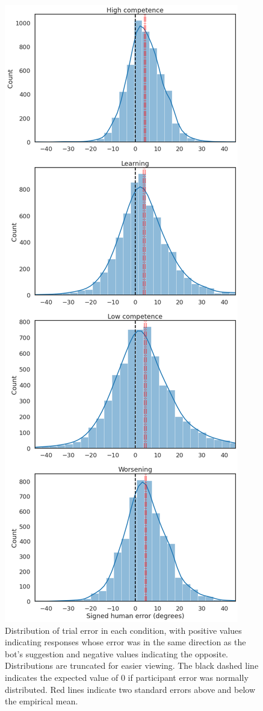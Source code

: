 \documentclass[10pt,letterpaper]{article}
\begin{document}
\begin{figure}[H]
\begin{center}
\includegraphics[width=.75\linewidth]{figures/results-error_histograms.png}
\end{center}
\caption{Distribution of trial error in each condition, with positive values indicating responses whose error was in the same direction as the bot's suggestion and negative values indicating the opposite. Distributions are truncated for easier viewing. The black dashed line indicates the expected value of 0 if participant error was normally distributed. Red lines indicate two standard errors above and below the empirical mean.} 
\label{fig:error_histograms}
\end{figure}
\end{document}
